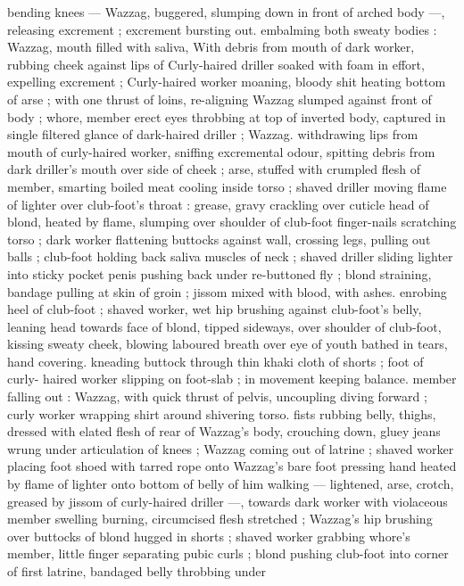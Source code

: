 bending knees --- Wazzag, buggered, slumping down in front of 
arched body ---, releasing excrement ; excrement bursting out. 
embalming both sweaty bodies : Wazzag, mouth filled with saliva, 
With debris from mouth of dark worker, rubbing cheek against lips of 
Curly-haired driller soaked with foam in effort, expelling excrement ; 
Curly-haired worker moaning, bloody shit heating bottom of arse ; 
with one thrust of loins, re-aligning Wazzag slumped against front of 
body ; whore, member erect eyes throbbing at top of inverted body, 
captured in single filtered glance of dark-haired driller ; Wazzag. 
withdrawing lips from mouth of curly-haired worker, sniffing 
excremental odour, spitting debris from dark driller's mouth over side 
of cheek ; arse, stuffed with crumpled flesh of member, smarting 
boiled meat cooling inside torso ; shaved driller moving flame of 
lighter over club-foot's throat : grease, gravy crackling over cuticle 
head of blond, heated by flame, slumping over shoulder of club-foot 
finger-nails scratching torso ; dark worker flattening buttocks against 
wall, crossing legs, pulling out balls ; club-foot holding back saliva 
muscles of neck ; shaved driller sliding lighter into sticky pocket 
penis pushing back under re-buttoned fly ; blond straining, bandage 
pulling at skin of groin ; jissom mixed with blood, with ashes. 
enrobing heel of club-foot ; shaved worker, wet hip brushing against 
club-foot's belly, leaning head towards face of blond, tipped 
sideways, over shoulder of club-foot, kissing sweaty cheek, blowing 
laboured breath over eye of youth bathed in tears, hand covering. 
kneading buttock through thin khaki cloth of shorts ; foot of curly- 
haired worker slipping on foot-slab ; in movement keeping balance. 
member falling out : Wazzag, with quick thrust of pelvis, uncoupling 
diving forward ; curly worker wrapping shirt around shivering torso. 
fists rubbing belly, thighs, dressed with elated flesh of rear of 
Wazzag's body, crouching down, gluey jeans wrung under 
articulation of knees ; Wazzag coming out of latrine ; shaved worker 
placing foot shoed with tarred rope onto Wazzag's bare foot 
pressing hand heated by flame of lighter onto bottom of belly of him 
walking --- lightened, arse, crotch, greased by jissom of curly-haired 
driller ---, towards dark worker with violaceous member swelling 
burning, circumcised flesh stretched ; Wazzag's hip brushing over 
buttocks of blond hugged in shorts ; shaved worker grabbing 
whore's member, little finger separating pubic curls ; blond pushing 
club-foot into corner of first latrine, bandaged belly throbbing under 
